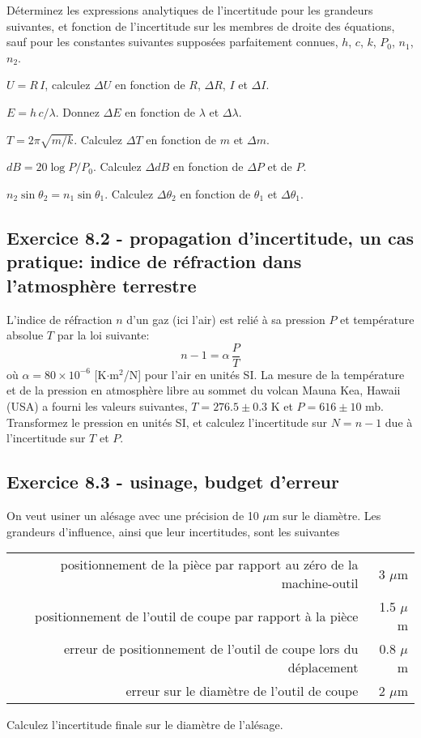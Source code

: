 Déterminez les expressions analytiques de l'incertitude pour les grandeurs suivantes, et fonction de l'incertitude sur les membres de droite des équations, sauf pour les constantes suivantes supposées parfaitement connues, $h$, $c$, $k$, $P_0$, $n_1$, $n_2$.
\begin{description}\renewcommand{\labelitemi}{$\bullet$}
    \item[loi d'Ohm] $U=R\,I$, calculez $\Delta U$ en fonction de $R$, $\Delta R$, $I$ et $\Delta I$.
    \item[Energie du photon] $E=h\,c/\lambda$. Donnez $\Delta E$ en fonction de $\lambda$ et $\Delta\lambda$.
    \item[Période d'oscillation masse et ressort] $T=2\pi\sqrt{m/k}$. Calculez $\Delta T$ en fonction de $m$ et $\Delta m$.
    \item[Décibels et puissance] $dB=20\log{P/P_0}$. Calculez $\Delta dB$ en fonction de $\Delta P$ et de $P$.
    \item[Loi de Snell (optique)] $n_2\sin{\theta_2}=n_1\sin{\theta_1}$. Calculez $\Delta\theta_2$ en fonction de $\theta_1$ et $\Delta\theta_1$.
\end{description}

\subsection*{Exercice 8.2 - propagation d'incertitude, un cas pratique: indice de réfraction dans l'atmosphère terrestre}

L'indice de réfraction $n$ d'un gaz (ici l'air) est relié à sa pression $P$ et température absolue $T$ par la loi suivante:
$$
    n-1=\alpha\,\frac{P}{T}
$$
où $\alpha=80\times10^{-6}$ [K$\cdot$m$^2$/N] pour l'air en unités SI. La mesure de la température et de la pression en atmosphère libre au sommet du volcan Mauna Kea, Hawaii (USA) a fourni les valeurs suivantes, $T=276.5\pm0.3$ K et $P=616\pm10$ mb. Transformez le pression en unités SI, et calculez l'incertitude sur $N=n-1$ due à l'incertitude sur $T$ et $P$.

\subsection*{Exercice 8.3 - usinage, budget d'erreur}

On veut usiner un alésage avec une précision de 10 $\mu$m sur le diamètre. Les grandeurs d'influence, ainsi que leur incertitudes, sont les suivantes
\begin{center}
    \begin{tabular}{r|r}
        positionnement de la pièce par rapport au zéro de la machine-outil & 3 $\mu$m   \\
        positionnement de l'outil de coupe par rapport à la pièce          & 1.5 $\mu$m \\
        erreur de positionnement de l'outil de coupe lors du déplacement   & 0.8 $\mu$m \\
        erreur sur le diamètre de l'outil de coupe                         & 2 $\mu$m
    \end{tabular}
\end{center}
Calculez l'incertitude finale sur le diamètre de l'alésage.

